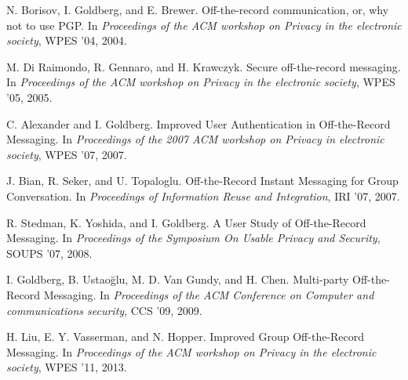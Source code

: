\begin{thebibliography}{xx}

	 N. Borisov, I. Goldberg, and E. Brewer. Off-the-record
		communication, or, why not to use PGP. In \textit{Proceedings of the ACM
		workshop on Privacy in the electronic society}, WPES ’04, 2004.

	 M. Di Raimondo, R. Gennaro, and H. Krawczyk. Secure
		off-the-record messaging. In \textit{Proceedings of the ACM workshop on
		Privacy in the electronic society}, WPES ’05, 2005.

	 C. Alexander and I. Goldberg. Improved User
		Authentication in Off-the-Record Messaging. In \textit{Proceedings of
		the 2007 ACM workshop on Privacy in electronic society}, WPES ’07, 2007.

	 J. Bian, R. Seker, and U. Topaloglu. Off-the-Record Instant
		Messaging for Group Conversation. In \textit{Proceedings of Information
		Reuse and Integration}, IRI ’07, 2007.

	 R. Stedman, K. Yoshida, and I. Goldberg. A User Study
		of Off-the-Record Messaging. In \textit{Proceedings of the Symposium On
		Usable Privacy and Security}, SOUPS ’07, 2008.

	 I. Goldberg, B. Ustaoğlu, M. D. Van Gundy, and H. Chen.
		Multi-party Off-the-Record Messaging. In \textit{Proceedings of the ACM
		Conference on Computer and communications security}, CCS ’09, 2009.

	 H. Liu, E. Y. Vasserman, and N. Hopper. Improved Group
		Off-the-Record Messaging. In \textit{Proceedings of the ACM workshop on
		Privacy in the electronic society}, WPES ’11, 2013.

\end{thebibliography}



